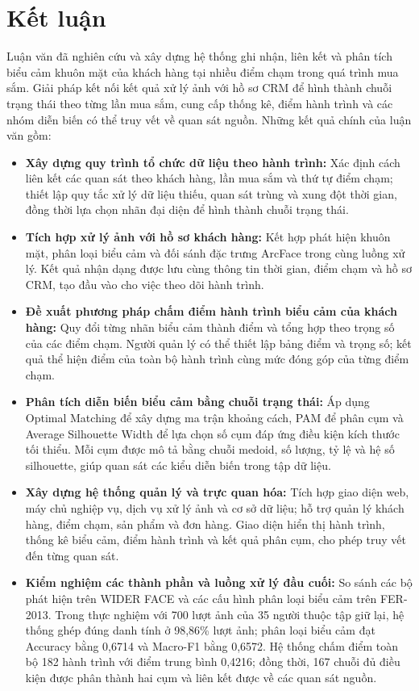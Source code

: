 \documentclass[../LuanVan.tex]{subfiles}
\begin{document}
\section{Kết luận}
\label{section:6.1}

Luận văn đã nghiên cứu và xây dựng hệ thống ghi nhận, liên kết và phân tích biểu cảm khuôn mặt của khách hàng tại nhiều điểm chạm trong quá trình mua sắm. Giải pháp kết nối kết quả xử lý ảnh với hồ sơ CRM để hình thành chuỗi trạng thái theo từng lần mua sắm, cung cấp thống kê, điểm hành trình và các nhóm diễn biến có thể truy vết về quan sát nguồn. Những kết quả chính của luận văn gồm:

\begin{itemize}
    \item \textbf{Xây dựng quy trình tổ chức dữ liệu theo hành trình:} Xác định cách liên kết các quan sát theo khách hàng, lần mua sắm và thứ tự điểm chạm; thiết lập quy tắc xử lý dữ liệu thiếu, quan sát trùng và xung đột thời gian, đồng thời lựa chọn nhãn đại diện để hình thành chuỗi trạng thái.

    \item \textbf{Tích hợp xử lý ảnh với hồ sơ khách hàng:} Kết hợp phát hiện khuôn mặt, phân loại biểu cảm và đối sánh đặc trưng ArcFace trong cùng luồng xử lý. Kết quả nhận dạng được lưu cùng thông tin thời gian, điểm chạm và hồ sơ CRM, tạo đầu vào cho việc theo dõi hành trình.

    \item \textbf{Đề xuất phương pháp chấm điểm hành trình biểu cảm của khách hàng:} Quy đổi từng nhãn biểu cảm thành điểm và tổng hợp theo trọng số của các điểm chạm. Người quản lý có thể thiết lập bảng điểm và trọng số; kết quả thể hiện điểm của toàn bộ hành trình cùng mức đóng góp của từng điểm chạm.

    \item \textbf{Phân tích diễn biến biểu cảm bằng chuỗi trạng thái:} Áp dụng Optimal Matching để xây dựng ma trận khoảng cách, PAM để phân cụm và Average Silhouette Width để lựa chọn số cụm đáp ứng điều kiện kích thước tối thiểu. Mỗi cụm được mô tả bằng chuỗi medoid, số lượng, tỷ lệ và hệ số silhouette, giúp quan sát các kiểu diễn biến trong tập dữ liệu.

    \item \textbf{Xây dựng hệ thống quản lý và trực quan hóa:} Tích hợp giao diện web, máy chủ nghiệp vụ, dịch vụ xử lý ảnh và cơ sở dữ liệu; hỗ trợ quản lý khách hàng, điểm chạm, sản phẩm và đơn hàng. Giao diện hiển thị hành trình, thống kê biểu cảm, điểm hành trình và kết quả phân cụm, cho phép truy vết đến từng quan sát.

    \item \textbf{Kiểm nghiệm các thành phần và luồng xử lý đầu cuối:} So sánh các bộ phát hiện trên WIDER FACE và các cấu hình phân loại biểu cảm trên FER-2013. Trong thực nghiệm với 700 lượt ảnh của 35 người thuộc tập giữ lại, hệ thống ghép đúng danh tính ở 98,86\% lượt ảnh; phân loại biểu cảm đạt Accuracy bằng 0,6714 và Macro-F1 bằng 0,6572. Hệ thống chấm điểm toàn bộ 182 hành trình với điểm trung bình 0,4216; đồng thời, 167 chuỗi đủ điều kiện được phân thành hai cụm và liên kết được về các quan sát nguồn.
\end{itemize}
\end{document}

